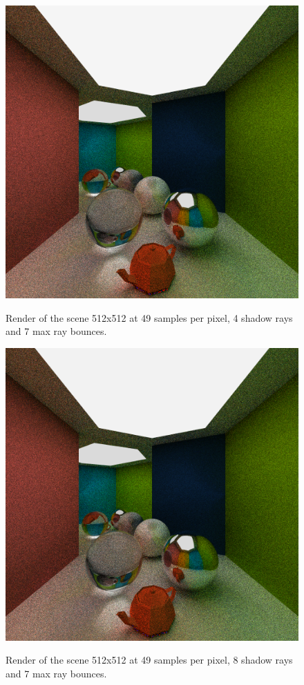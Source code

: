 \documentclass[a4paper, twocolumn]{article}
\begin{document}
            \begin{figure}[H]
                \centering
                \caption{Render of the scene 512x512 at 49 samples per pixel, 4 shadow rays and 7 max ray bounces.}
                \includegraphics[width=0.8\linewidth]{share/results/shadow_rays_4.png}
                \label{fig:shadow_rays_4}
            \end{figure}

            \begin{figure}[H]
                \centering
                \caption{Render of the scene 512x512 at 49 samples per pixel, 8 shadow rays and 7 max ray bounces.}
                \includegraphics[width=0.8\linewidth]{share/results/shadow_rays_8.png}
                \label{fig:shadow_rays_8}
            \end{figure}
\end{document}

